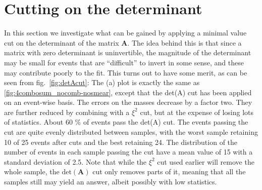 \documentclass[twoside,english]{uiofysmaster}
\begin{document}
\section{Cutting on the determinant}
In this section we investigate what can be gained by applying a minimal value cut on the determinant of the matrix $\mathbf{A}$. The idea behind this is that since a matrix with zero determinant is uninvertible, the magnitude of the determinant may be small for events that are ``difficult'' to invert in some sense, and these may contribute poorly to the fit. This turns out to have some merit, as can be seen from fig.\ \ref{fig:detAcut}: The (a) plot is exactly the same as \ref{fig:4combosum_nocomb-nosmear}, except that the det(A) cut has been applied on an event-wise basis. The errors on the masses decrease by a factor two. They are further reduced by combining with a $\xi^2$ cut, but at the expense of losing lots of statistics. About 60 \% of events pass the det(A) cut. The events passing the cut are quite evenly distributed between samples, with the worst sample retaining 10 of 25 events after cuts and the best retaining 24. The distribution of the number of events in each sample passing the cut have a mean value of 15 with a standard deviation of 2.5. Note that while the $\xi^2$ cut used earlier will remove the whole sample, the $\mathrm{det}(\mathbf{A})$ cut only removes parts of it, meaning that all the samples still may yield an answer, albeit possibly with low statistics.
\end{document}
